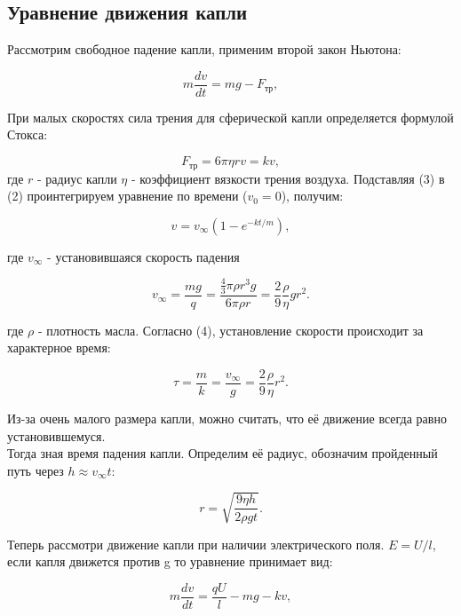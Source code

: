 \documentclass[a4paper,12pt]{article} %
\begin{document}
\subsection*{Уравнение движения капли}
Рассмотрим свободное падение капли, применим второй закон Ньютона:

\begin{equation}
    m \frac{dv}{dt} = mg - F_{\text{тр}},
\end{equation}

При малых скоростях сила трения для сферической капли определяется формулой Стокса:

\begin{equation}
    F_{\text{тр}} = 6\pi\eta r v = kv,
\end{equation}
где $r$ - радиус капли $\eta$ - коэффициент вязкости трения воздуха.
Подставляя (3) в (2) проинтегрируем уравнение по времени ($v_{0} = 0$), получим:

\begin{equation}
    v = v_{\infty}(1 - e^{-kt/m}),
\end{equation}

где $v_{\infty}$ - установившаяся скорость падения

\begin{equation}
    v_{\infty} = \frac{mg}{q}=\frac{\frac{4}{3} \pi \rho r^{3} g}{6 \pi \rho r}=\frac{2}{9}\frac{\rho}{\eta}g r^{2}.
\end{equation}

где $\rho$ - плотность масла. Согласно (4), установление скорости происходит за характерное время:

\begin{equation}
    \tau = \frac{m}{k}=\frac{v_{\infty}}{g} = \frac{2}{9}\frac{\rho}{\eta} r^{2}.
\end{equation}

Из-за очень малого размера капли, можно считать, что её движение всегда равно \\ установившемуся.
\\
Тогда зная время падения капли. Определим её радиус, обозначим пройденный путь через $h \approx v_{\infty}t$:

\begin{equation}
    r = \sqrt{\frac{9 \eta h}{2 \rho gt} }.
\end{equation}

Теперь рассмотри движение капли при наличии электрического поля. $E=U/l$, если капля движется против g то уравнение принимает вид:

\begin{equation}
    m\frac{dv}{dt} = \frac{qU}{l} - mg - kv,
\end{equation}
\end{document}

